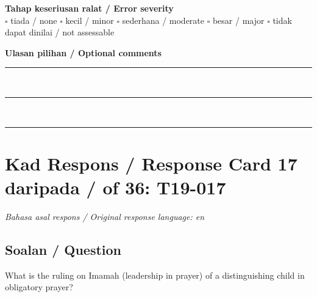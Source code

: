 \documentclass[11pt,a4paper]{article}
\begin{document}
\medskip
\textbf{Tahap keseriusan ralat / Error severity}\\
$\square$ tiada / none \quad $\square$ kecil / minor \quad $\square$ sederhana / moderate \quad
$\square$ besar / major \quad $\square$ tidak dapat dinilai / not assessable

\medskip
\textbf{Ulasan pilihan / Optional comments}\\[3pt]
\rule{\textwidth}{0.4pt}\\[16pt]
\rule{\textwidth}{0.4pt}\\[16pt]
\rule{\textwidth}{0.4pt}

\newpage
\section*{Kad Respons / Response Card 17 daripada / of 36: T19-017}
\textit{Bahasa asal respons / Original response language: en}

\subsection*{Soalan / Question}
What is the ruling on Imamah (leadership in prayer) of a distinguishing child in obligatory prayer?
\end{document}
